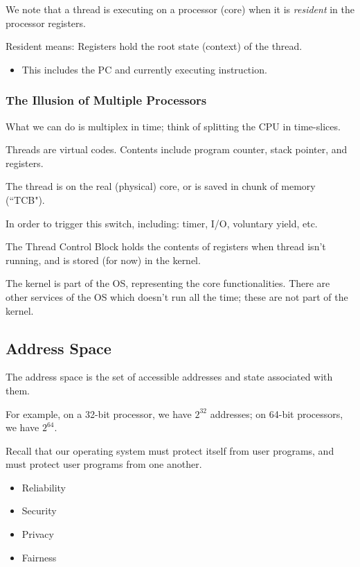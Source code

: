 \documentclass[openany]{book}
\begin{document}
We note that a thread is executing on a processor (core) when it is \textit{resident} in the processor registers.

\begin{defn}[Resident]
	Resident means: Registers hold the root state (context) of the thread.
	\begin{itemize}
		\item This includes the PC and currently executing instruction.
	\end{itemize}
\end{defn}

\subsubsection{The Illusion of Multiple Processors}
What we can do is multiplex in time; think of splitting the CPU in time-slices.

Threads are virtual codes. Contents include program counter, stack pointer, and registers.

The thread is on the real (physical) core, or is saved in chunk of memory (``TCB").

In order to trigger this switch, including: timer, I/O, voluntary yield, etc.

The Thread Control Block holds the contents of registers when thread isn't running, and is stored (for now) in the kernel.

\begin{warn}
	The kernel is part of the OS, representing the core functionalities. There are other services of the OS which doesn't run all the time; these are not part of the kernel.
\end{warn}

\subsection{Address Space}
\begin{defn}
	The address space is the set of accessible addresses and state associated with them.
\end{defn}

\begin{example}
	For example, on a 32-bit processor, we have $2^{32}$ addresses; on 64-bit processors, we have $2^{64}$.
\end{example}

Recall that our operating system must protect itself from user programs, and must protect user programs from one another.
\begin{itemize}
	\item Reliability
	\item Security
	\item Privacy
	\item Fairness
\end{itemize}
\end{document}
